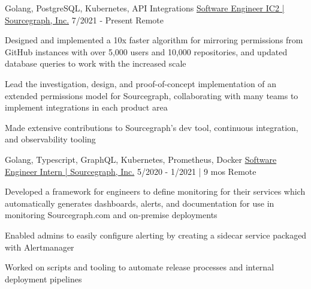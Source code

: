 
\begin{cventries}
  \cventry
    {Golang, PostgreSQL, Kubernetes, API Integrations} %
    {\href{https://bobheadxi.dev/experience/sourcegraph}{Software Engineer IC2 | Sourcegraph, Inc.}} %
    {7/2021 - Present} %
    {Remote} %
    {
        \begin{cvitems}
          \item {Designed and implemented a 10x faster algorithm for mirroring permissions from GitHub instances with over 5,000 users and 10,000 repositories, and updated database queries to work with the increased scale}
          \item {Lead the investigation, design, and proof-of-concept implementation of an extended permissions model for Sourcegraph, collaborating with many teams to implement integrations in each product area}
          \item {Made extensive contributions to Sourcegraph's dev tool, continuous integration, and observability tooling}
        \end{cvitems}
    }

  \cventry
    {Golang, Typescript, GraphQL, Kubernetes, Prometheus, Docker} %
    {\href{https://bobheadxi.dev/experience/sourcegraph-intern}{Software Engineer Intern | Sourcegraph, Inc.}} %
    {5/2020 - 1/2021 | 9 mos} %
    {Remote} %
    {
      \begin{cvitems} %
        \item {Developed a framework for engineers to define monitoring for their services which automatically generates dashboards, alerts, and documentation for use in monitoring Sourcegraph.com and on-premise deployments}
        \item {Enabled admins to easily configure alerting by creating a sidecar service packaged with Alertmanager}
        \item {Worked on scripts and tooling to automate release processes and internal deployment pipelines}
      \end{cvitems}
    }


\end{cventries}
